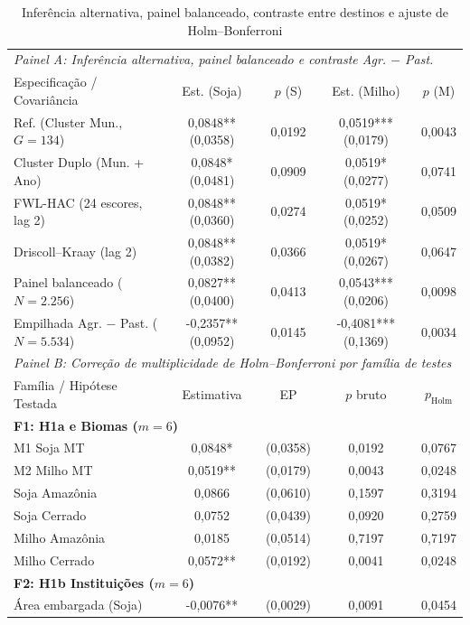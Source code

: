 \begin{table}[htbp]
\centering
\footnotesize
\setlength{\tabcolsep}{3.0pt}
\captionstyle{\centering}
\normalcaption
\caption{Inferência alternativa, painel balanceado, contraste entre destinos e ajuste de Holm--Bonferroni}
\label{tab:ap-inferencia-holm}
\begin{tabular}{lcccc}
\toprule
\multicolumn{5}{l}{\textit{Painel A: Inferência alternativa, painel balanceado e contraste Agr. $-$ Past.}} \\
Especificação / Covariância & Est. (Soja) & $p$ (S) & Est. (Milho) & $p$ (M) \\
\midrule
Ref. (Cluster Mun., $G=134$) & 0,0848** (0,0358) & 0,0192 & 0,0519*** (0,0179) & 0,0043 \\
Cluster Duplo (Mun. + Ano) & 0,0848* (0,0481) & 0,0909 & 0,0519* (0,0277) & 0,0741 \\
FWL-HAC (24 escores, lag 2) & 0,0848** (0,0360) & 0,0274 & 0,0519* (0,0252) & 0,0509 \\
Driscoll--Kraay (lag 2) & 0,0848** (0,0382) & 0,0366 & 0,0519* (0,0267) & 0,0647 \\
Painel balanceado ($N=2.256$) & 0,0827** (0,0400) & 0,0413 & 0,0543*** (0,0206) & 0,0098 \\
Empilhada Agr. $-$ Past. ($N=5.534$) & -0,2357** (0,0952) & 0,0145 & -0,4081*** (0,1369) & 0,0034 \\
\midrule
\multicolumn{5}{l}{\textit{Painel B: Correção de multiplicidade de Holm--Bonferroni por família de testes}} \\
Família / Hipótese Testada & Estimativa & EP & $p$ bruto & $p_{\text{Holm}}$ \\
\midrule
\multicolumn{5}{l}{\textbf{F1: H1a e Biomas ($m=6$)}} \\
\quad M1 Soja MT & 0,0848* & (0,0358) & 0,0192 & 0,0767 \\
\quad M2 Milho MT & 0,0519** & (0,0179) & 0,0043 & 0,0248 \\
\quad Soja Amazônia & 0,0866 & (0,0610) & 0,1597 & 0,3194 \\
\quad Soja Cerrado & 0,0752 & (0,0439) & 0,0920 & 0,2759 \\
\quad Milho Amazônia & 0,0185 & (0,0514) & 0,7197 & 0,7197 \\
\quad Milho Cerrado & 0,0572** & (0,0192) & 0,0041 & 0,0248 \\
\multicolumn{5}{l}{\textbf{F2: H1b Instituições ($m=6$)}} \\
\quad Área embargada (Soja) & -0,0076** & (0,0029) & 0,0091 & 0,0454 \\

\end{tabular}
\end{table}
